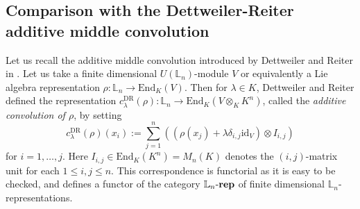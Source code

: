 \documentclass[a4paper,12pt]{article}
\theoremstyle{definition}
\theoremstyle{remark}
\begin{document}
\subsection{Comparison with the Dettweiler-Reiter additive middle convolution}
Let us recall the additive middle convolution 
introduced by Dettweiler and Reiter in \cite{DR00,DR07}. 
Let us take a finite dimensional 
$U(\mathbb{L}_{n})$-module $V$ or equivalently 
a Lie algebra 
representation $\rho\colon \mathbb{L}_{n}\rightarrow \mathrm{End}_{K}(V)$.
Then for $\lambda\in K$,
Dettweiler and Reiter defined the representation 
$c^{\mathrm{DR}}_{\lambda}(\rho)\colon \mathbb{L}_{n}\rightarrow \mathrm{End}_{K}(V\otimes_{K}K^{n})$,
called the \emph{additive convolution of $\rho$}, by setting 
\[
	c^{\mathrm{DR}}_{\lambda}(\rho)(x_{i}):=\sum_{j=1}^{n}
	\left(
		(\rho(x_{j})+\lambda\delta_{i,j}\mathrm{id}_{V})\otimes I_{i,j}
	\right)
\]
for $i=1,\ldots,j$. Here $I_{i,j}\in \mathrm{End}_{K}(K^{n})=M_{n}(K)$
denotes the $(i,j)$-matrix unit for each $1\le i,j\le n$.
This correspondence is functorial as it is easy to be checked,
and defines a functor of 
the category $\mathbb{L}_{n}\text{-\textbf{rep}}$
of finite dimensional $\mathbb{L}_{n}$-representations.
\end{document}
